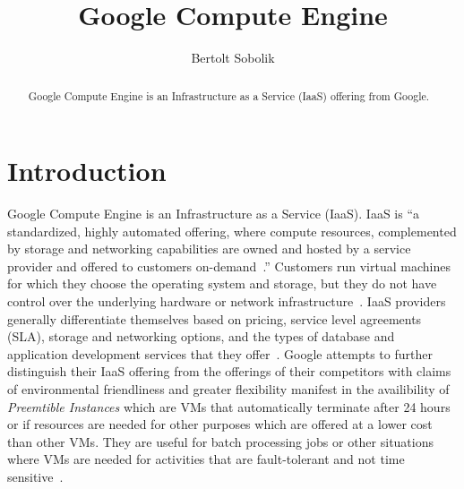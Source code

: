 
\title{Google Compute Engine}


\author{Bertolt Sobolik}

\renewcommand{\shortauthors}{B. Sobolik}


\begin{abstract}
Google Compute Engine is an Infrastructure as a Service (IaaS)
offering from Google.
\end{abstract}



\maketitle

\section{Introduction}
Google Compute Engine is an Infrastructure as a Service (IaaS). IaaS
is ``a standardized, highly automated offering, where compute
resources, complemented by storage and networking capabilities are
owned and hosted by a service provider and offered to customers
on-demand~\cite{hid-sp18-419-gartneritglossaryiaas}.''  Customers run
virtual machines for which they choose the operating system and
storage, but they do not have control over the underlying hardware or
network infrastructure~\cite{hid-sp18-419-mell2011nist}. IaaS
providers generally differentiate themselves based on pricing, service
level agreements (SLA), storage and networking options, and the types
of database and application development services that they
offer~\cite{hid-sp18-419-perficientchoosingiaas}. Google attempts to
further distinguish their IaaS offering from the offerings of their
competitors with claims of environmental friendliness and greater
flexibility manifest in the availibility of \textit{Preemtible
Instances} which are VMs that automatically terminate after 24 hours
or if resources are needed for other purposes which are offered at a
lower cost than other VMs. They are useful for batch processing jobs
or other situations where VMs are needed for activities that are
fault-tolerant and not time sensitive~\cite{hid-sp18-419-gce}.


